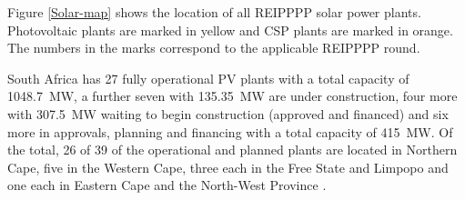 
Figure \ref{Solar-map} shows the location of all REIPPPP solar power plants. Photovoltaic plants are marked in yellow and CSP plants are marked in orange. The numbers in the marks correspond to the applicable REIPPPP round.


%

South Africa has 27 fully operational PV plants with a total capacity of \SI{1048.7}{\mega\watt}, a further seven with \SI{135.35}{\mega\watt} are under construction, four more with \SI{307.5}{\mega\watt} waiting to begin construction (approved and financed) and six more in approvals, planning and financing with a total capacity of \SI{415}{\mega\watt}. Of the total, 26 of 39 of the operational and planned plants are located in Northern Cape, five in the Western Cape, three each in the Free State and Limpopo and one each in Eastern Cape and the North-West Province \cite{Forder2015}.


\pagebreak

